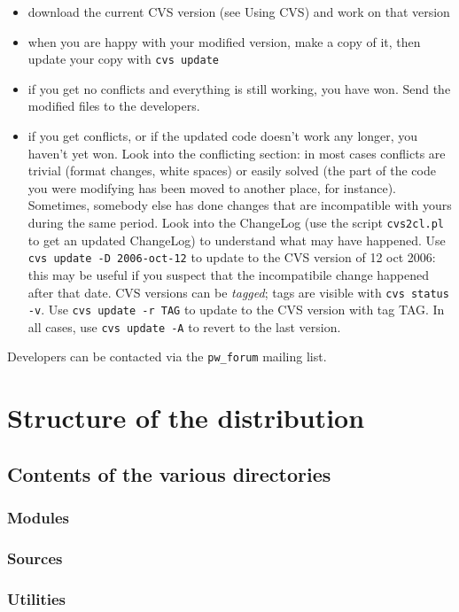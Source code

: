 \documentclass[12pt,a4paper]{article}
\begin{document}
\begin{itemize}
\item download the current CVS version (see Using CVS) and work on that version
\item when you are happy with your modified version, make a copy of it, then update your copy with \texttt{cvs update}
\item if you get no conflicts and everything is still working, you have won. Send the modified files to the developers.
\item if you get conflicts, or if the updated code doesn't work any longer, you haven't yet won. Look into the conflicting section: in most cases conflicts are trivial (format changes, white spaces) or easily solved (the part of the code you were modifying has been moved to another place, for instance). Sometimes, somebody else has done changes that are incompatible with yours during the same period. Look into the ChangeLog (use the script \texttt{cvs2cl.pl} to get an updated ChangeLog) to understand what may have happened.  
Use \texttt{cvs update -D 2006-oct-12} to update to the CVS version 
of 12 oct 2006: this may be useful if you suspect that the incompatibile 
change happened after that date. CVS versions can be {\em tagged}; 
tags are visible with \texttt{cvs status -v}. Use \texttt{cvs update -r TAG}
to update to the CVS version with tag TAG. In all cases, use 
\texttt{cvs update -A} to revert to the last version.
\end{itemize}
Developers can be contacted via the \texttt{pw\_forum} mailing list.

\section{ Structure of the distribution}
\subsection{Contents of the various directories}
\subsubsection{ Modules}
\subsubsection{ Sources}
\subsubsection{ Utilities}
\end{document}
